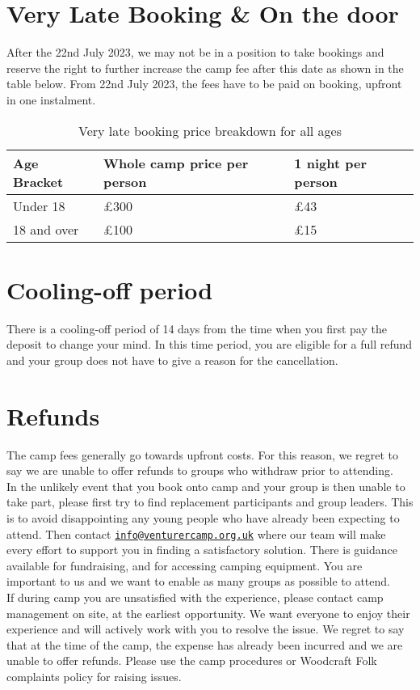 \section{Very Late Booking \& On the door}
After the 22nd July 2023, we may not be in a position to take bookings and reserve the right to further increase the camp fee after this date as shown in the table below. From 22nd July 2023, the fees have to be paid on booking, upfront in one instalment. 
\begin{table}[H]
    \centering   
    \begin{tabularx}{0.9\textwidth}{XXX}
        \textbf{Age Bracket} & \textbf{Whole camp price per person} & \textbf{1 night per person} \\
        \hline
        \hline
        Under 18 & £300 & £43\\
        \hline
        18 and over & £100 & £15\\
        \hline
    \end{tabularx}
    \caption{Very late booking price breakdown for all ages}
\end{table}

\section{Cooling-off period}
There is a cooling-off period of 14 days from the time when you first pay the deposit to change your mind. In this time period, you are eligible for a full refund and your group does not have to give a reason for the cancellation.

\section{Refunds}
The camp fees generally go towards upfront costs.  For this reason, we regret to say we are unable to offer refunds to groups who withdraw prior to attending.\\[1em]
In the unlikely event that you book onto camp and your group is then unable to take part, please first try to find replacement participants and group leaders. This is to avoid disappointing any young people who have already been expecting to attend. Then contact \href{mailto:info@venturercamp.org.uk}{\texttt{info@venturercamp.org.uk}} where our team will make every effort to support you in finding a satisfactory solution. There is guidance available for fundraising, and for accessing camping equipment. You are important to us and we want to enable as many groups as possible to attend.\\[1em]
If during camp you are unsatisfied with the experience, please contact camp management on site, at the earliest opportunity. We want everyone to enjoy their experience and will actively work with you to resolve the issue. We regret to say that at the time of the camp, the expense has already been incurred and we are unable to offer refunds. Please use the camp procedures or Woodcraft Folk complaints policy for raising issues.

